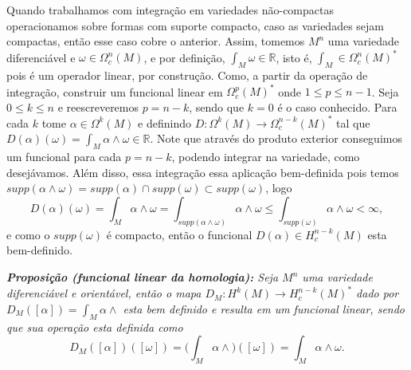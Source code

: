 \documentclass{article}
\begin{document}
	Quando trabalhamos com integração em variedades não-compactas operacionamos sobre formas com suporte compacto, caso as variedades sejam compactas, então esse caso cobre o anterior. Assim, tomemos $M^{n}$ uma variedade diferenciável e $\omega \in \Omega_{c}^{n}(M)$, e por definição, $\int_{M}\omega \in \mathbb{R}$, isto é, $\int_{M} \in \Omega_{c}^{n}(M)^{*}$ pois é um operador linear, por construção. Como, a partir da operação de integração, construir um funcional linear em $\Omega_{c}^{p}(M)^{*}$ onde $1 \leq p \leq n-1$. Seja $0\leq k \leq n$ e reescreveremos $p = n-k$, sendo que $k=0$ é o caso conhecido. Para cada $k$ tome $\alpha \in \Omega^{k}(M)$ e definindo $D : \Omega^{k}(M) \to \Omega_{c}^{n-k}(M)^{*}$ tal que $D(\alpha)(\omega) = \int_{M}\alpha \wedge \omega \in \mathbb{R}$. Note que através do produto exterior conseguimos um funcional para cada $p = n-k$, podendo integrar na variedade, como desejávamos. Além disso, essa integração essa aplicação bem-definida pois temos $supp(\alpha\wedge \omega) = supp(\alpha) \cap supp(\omega) \subset supp(\omega)$, logo
	$$
	D(\alpha)(\omega) = \int_{M}\alpha \wedge \omega  = \int_{supp(\alpha \wedge \omega  )}\alpha \wedge \omega  \leq \int_{supp(\omega)}\alpha \wedge \omega < \infty,$$
	e como o $supp(\omega)$ é compacto, então o funcional $D(\alpha) \in H^{n-k}_{c}(M)$ esta bem-definido. 
	
	\vspace{2mm}
	\textit{\textbf{Proposição (funcional linear da homologia):} Seja $M^{n}$ uma variedade diferenciável e orientável, então o mapa $D_{M}: H^{k}(M) \to H^{n-k}_{c}(M)^{*}$ dado por $D_{M}([\alpha]) = \int_{M} \alpha \wedge$ esta bem definido e resulta em um funcional linear, sendo que sua operação esta definida como}
	$$
	D_{M}([\alpha])([\omega]) = \Big( \int_{M} \alpha \wedge \Big)([\omega]) = \int_{M} \alpha \wedge \omega.
	$$
	
\end{document}
